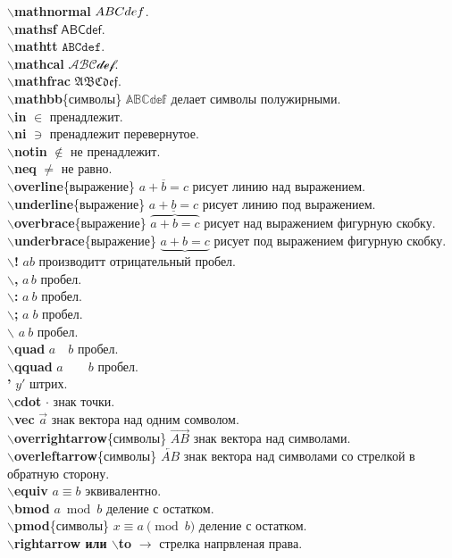 \documentclass{article}
\newcommand{\bb}[1]{{\bfseries $\backslash$#1}} %
\begin{document}
\bb{mathnormal} $\mathnormal{ABCdef}$.\\
\bb{mathsf} $\mathsf{ABCdef}$.\\
\bb{mathtt} $\mathtt{ABCdef}$.\\
\bb{mathcal} $\mathcal{ABCdef}$.\\
\bb{mathfrac} $\mathfrak{ABCdef}$.\\
\bb{mathbb}\{символы\} $\mathbb{ABCdef}$ делает символы полужирными.\\
\bb{in} $\in$ пренадлежит.\\
\bb{ni} $\ni$ пренадлежит перевернутое.\\
\bb{notin} $\notin$ не пренадлежит.\\
\bb{neq} $\neq$ не равно.\\
\bb{overline}\{выражение\} $\overline{a+b=c}$ рисует линию над выражением.\\
\bb{underline}\{выражение\} $\underline{a+b=c}$ рисует линию под выражением.\\
\bb{overbrace}\{выражение\} $\overbrace{a+b=c}$ рисует над выражением фигурную скобку.\\
\bb{underbrace}\{выражение\} $\underbrace{a+b=c}$ рисует под выражением фигурную скобку.\\
\bb{!} $a\! b$ производитт отрицательный пробел.\\
\bb{,} $a\, b$ пробел.\\
\bb{:} $a\: b$ пробел.\\
\bb{;} $a\; b$ пробел.\\
\bb{} $a\ b$ пробел.\\
\bb{quad} $a\quad b$ пробел.\\
\bb{qquad} $a\qquad b$ пробел.\\
{\bfseries '} $y'$ штрих.\\
\bb{cdot} $\cdot$ знак точки.\\
\bb{vec} $\vec a$ знак вектора над одним сомволом.\\
\bb{overrightarrow}\{символы\} $\overrightarrow{AB}$ знак вектора над символами.\\
\bb{overleftarrow}\{символы\} $\overleftarrow{AB}$ знак вектора над символами со стрелкой в обратную сторону.\\
\bb{equiv} $a\equiv b$ эквивалентно.\\
\bb{bmod} $a \bmod b$ деление с остатком.\\
\bb{pmod}\{символы\} $x \equiv a \pmod{b}$ деление с остатком.\\
\bb{rightarrow или $\backslash$to} $\rightarrow$ стрелка напрвленая права.\\
\end{document}
